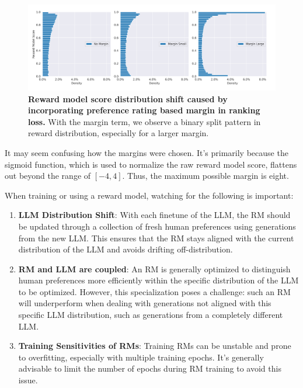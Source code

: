\documentclass[
  letterpaper,
  DIV=11,
  numbers=noendperiod,
  oneside]{scrreprt}
\theoremstyle{remark}
\begin{document}
\begin{figure}

{\centering \includegraphics{src/Figures/margin-2.png}

}

\caption{\textbf{Reward model score distribution shift caused by
incorporating preference rating based margin in ranking loss.} With the
margin term, we observe a binary split pattern in reward distribution,
especially for a larger margin.}

\end{figure}%

It may seem confusing how the margins were chosen. It's primarily
because the sigmoid function, which is used to normalize the raw reward
model score, flattens out beyond the range of \([-4, 4]\). Thus, the
maximum possible margin is eight.

When training or using a reward model, watching for the following is
important:

\begin{enumerate}
\def\labelenumi{\arabic{enumi}.}
\item
  \textbf{LLM Distribution Shift}: With each finetune of the LLM, the RM
  should be updated through a collection of fresh human preferences
  using generations from the new LLM. This ensures that the RM stays
  aligned with the current distribution of the LLM and avoids drifting
  off-distribution.
\item
  \textbf{RM and LLM are coupled}: An RM is generally optimized to
  distinguish human preferences more efficiently within the specific
  distribution of the LLM to be optimized. However, this specialization
  poses a challenge: such an RM will underperform when dealing with
  generations not aligned with this specific LLM distribution, such as
  generations from a completely different LLM.
\item
  \textbf{Training Sensitivities of RMs}: Training RMs can be unstable
  and prone to overfitting, especially with multiple training epochs.
  It's generally advisable to limit the number of epochs during RM
  training to avoid this issue.
\end{enumerate}
\end{document}
